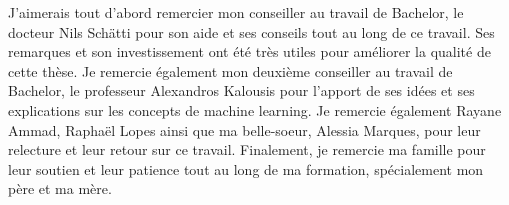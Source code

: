 \documentclass[12pt]{article}
\begin{document}
J'aimerais tout d'abord remercier mon conseiller au travail de Bachelor, le docteur Nils Schätti pour son aide et ses conseils tout au long de ce travail.
Ses remarques et son investissement ont été très utiles pour améliorer la qualité de cette thèse.
\newline\newline
Je remercie également mon deuxième conseiller au travail de Bachelor, le professeur Alexandros Kalousis pour l'apport de ses idées et ses explications sur les concepts de machine learning.
\newline\newline
Je remercie également Rayane Ammad, Raphaël Lopes ainsi que ma belle-soeur, Alessia Marques, pour leur relecture et leur retour sur ce travail.
\newline\newline
Finalement, je remercie ma famille pour leur soutien et leur patience tout au long de ma formation, spécialement mon père et ma mère.

\newpage
\end{document}
